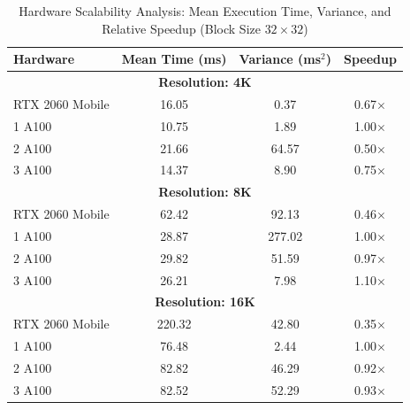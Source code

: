 \begin{table}[h!]
    \centering
    \caption{Hardware Scalability Analysis: Mean Execution Time, Variance, and Relative Speedup (Block Size $32\times32$)}
    \label{tab:hw_scalability}
    \begin{tabular}{lccc}
        \toprule
        \textbf{Hardware} & \textbf{Mean Time (ms)} & \textbf{Variance (ms$^2$)} & \textbf{Speedup} \\
        \midrule
        \multicolumn{4}{c}{\textbf{Resolution: 4K}} \\
        \midrule
        RTX 2060 Mobile & 16.05 & 0.37 & 0.67$\times$ \\
        1 A100 & 10.75 & 1.89 & 1.00$\times$ \\
        2 A100 & 21.66 & 64.57 & 0.50$\times$ \\
        3 A100 & 14.37 & 8.90 & 0.75$\times$ \\
        \midrule
        \multicolumn{4}{c}{\textbf{Resolution: 8K}} \\
        \midrule
        RTX 2060 Mobile & 62.42 & 92.13 & 0.46$\times$ \\
        1 A100 & 28.87 & 277.02 & 1.00$\times$ \\
        2 A100 & 29.82 & 51.59 & 0.97$\times$ \\
        3 A100 & 26.21 & 7.98 & 1.10$\times$ \\
        \midrule
        \multicolumn{4}{c}{\textbf{Resolution: 16K}} \\
        \midrule
        RTX 2060 Mobile & 220.32 & 42.80 & 0.35$\times$ \\
        1 A100 & 76.48 & 2.44 & 1.00$\times$ \\
        2 A100 & 82.82 & 46.29 & 0.92$\times$ \\
        3 A100 & 82.52 & 52.29 & 0.93$\times$ \\
        \bottomrule
    \end{tabular}
\end{table}
